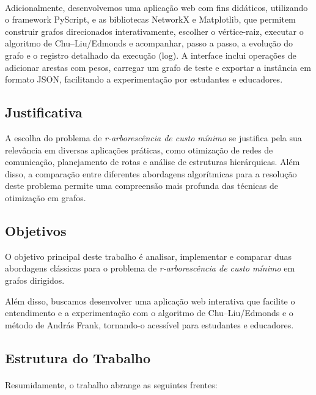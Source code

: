 \documentclass[12pt,a4paper]{article}
\begin{document}
\paragraph{}
Adicionalmente, desenvolvemos uma aplicação web com fins didáticos, utilizando o framework PyScript, e as bibliotecas NetworkX e Matplotlib, que permitem construir grafos direcionados interativamente, escolher o vértice-raiz, executar o algoritmo de Chu--Liu/Edmonds e acompanhar, passo a passo, a evolução do grafo e o registro detalhado da execução (log). A interface inclui operações de adicionar arestas com pesos, carregar um grafo de teste e exportar a instância em formato JSON, facilitando a experimentação por estudantes e educadores.

\subsection{Justificativa}

A escolha do problema de \textit{r-arborescência de custo mínimo} se justifica pela sua relevância em diversas aplicações práticas, como otimização de redes de comunicação, planejamento de rotas e análise de estruturas hierárquicas. Além disso, a comparação entre diferentes abordagens algorítmicas para a resolução deste problema permite uma compreensão mais profunda das técnicas de otimização em grafos.

\subsection{Objetivos}
O objetivo principal deste trabalho é analisar, implementar e comparar duas abordagens clássicas para o problema de \textit{r-arborescência de custo mínimo} em grafos dirigidos.

Além disso, buscamos desenvolver uma aplicação web interativa que facilite o entendimento e a experimentação com o algoritmo de Chu--Liu/Edmonds e o método de András Frank, tornando-o acessível para estudantes e educadores.

\subsection{Estrutura do Trabalho}
\paragraph{}
Resumidamente, o trabalho abrange as seguintes frentes:  
\end{document}
